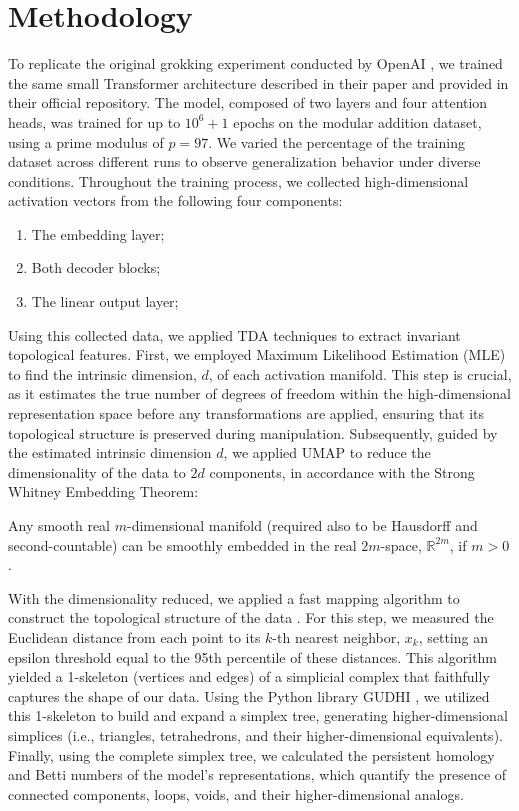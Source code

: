 \section{Methodology}

To replicate the original grokking experiment conducted by OpenAI \cite{GrokkingOpenAI}, we trained the same small Transformer architecture described in their paper and provided in their official repository. The model, composed of two layers and four attention heads, was trained for up to $10^6+1$ epochs on the modular addition dataset, using a prime modulus of $p=97$. We varied the percentage of the training dataset across different runs to observe generalization behavior under diverse conditions. Throughout the training process, we collected high-dimensional activation vectors from the following four components:

\begin{enumerate}
    \item The embedding layer;
    \item Both decoder blocks;
    \item The linear output layer;
\end{enumerate}

Using this collected data, we applied TDA techniques to extract invariant topological features. First, we employed Maximum Likelihood Estimation (MLE) \cite{LevinaBickel} to find the intrinsic dimension, $d$, of each activation manifold. This step is crucial, as it estimates the true number of degrees of freedom within the high-dimensional representation space before any transformations are applied, ensuring that its topological structure is preserved during manipulation. Subsequently, guided by the estimated intrinsic dimension $d$, we applied UMAP to reduce the dimensionality of the data to $2d$ components, in accordance with the Strong Whitney Embedding Theorem:

\begin{theorem}
    Any smooth real $m$-dimensional manifold (required also to be Hausdorff and second-countable) can be smoothly embedded in the real $2m$-space, $\mathbb{R}^{2m}$,⁠ if $m > 0$. 
\end{theorem}

With the dimensionality reduced, we applied a fast mapping algorithm to construct the topological structure of the data \cite{QuickMapper}. For this step, we measured the Euclidean distance from each point to its $k$-th nearest neighbor, $x_k$, setting an epsilon threshold equal to the 95th percentile of these distances. This algorithm yielded a 1-skeleton (vertices and edges) of a simplicial complex that faithfully captures the shape of our data. Using the Python library GUDHI \cite{GUDHI}, we utilized this 1-skeleton to build and expand a simplex tree, generating higher-dimensional simplices (i.e., triangles, tetrahedrons, and their higher-dimensional equivalents). Finally, using the complete simplex tree, we calculated the persistent homology and Betti numbers of the model's representations, which quantify the presence of connected components, loops, voids, and their higher-dimensional analogs.